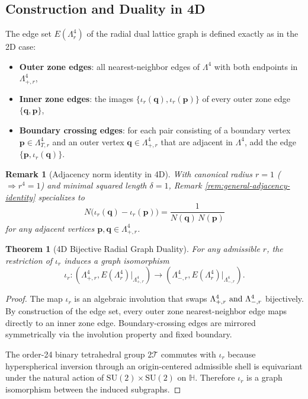 \documentclass{article}
\newtheorem{theorem}{Theorem}
\newtheorem{remark}{Remark}
\begin{document}
\subsection{Construction and Duality in 4D}
\label{subsec:4d-graph-construction-duality}
The edge set \(E(\Lambda_r^4)\) of the radial dual lattice graph is defined exactly as in the 2D case:
\begin{itemize}
  \item \textbf{Outer zone edges}: all nearest-neighbor edges of \(\Lambda^4\) with both endpoints in \(\Lambda_{+,r}^4\),
  \item \textbf{Inner zone edges}: the images \(\{\iota_r(\mathbf{q}),\iota_r(\mathbf{p})\}\) of every outer zone edge \(\{\mathbf{q},\mathbf{p}\}\),
  \item \textbf{Boundary crossing edges}: for each pair consisting of a boundary vertex \(\mathbf{p} \in \Lambda_{T,r}^4\) and an outer vertex \(\mathbf{q}\in\Lambda_{+,r}^4\) that are adjacent in \(\Lambda^4\), add the edge \(\{\mathbf{p},\iota_r(\mathbf{q})\}\).
\end{itemize}

\begin{remark}[Adjacency norm identity in 4D]
\label{rem:adj-norm-identity-4d}
With canonical radius $r=1$ ($\Rightarrow r^4=1$) and minimal squared length $\delta=1$, Remark \ref{rem:general-adjacency-identity} specializes to
\[
N\bigl(\iota_r(\mathbf{q}) - \iota_r(\mathbf{p})\bigr) = \frac{1}{N(\mathbf{q})\,N(\mathbf{p})}
\]
for any adjacent vertices $\mathbf{p},\mathbf{q} \in \Lambda_{+,r}^4$.
\end{remark}

\begin{theorem}[4D Bijective Radial Graph Duality]
\label{thm:4d-duality}
For any admissible \(r\), the restriction of \(\iota_r\) induces a graph isomorphism
\[
\iota_r\colon(\Lambda_{+,r}^4,E(\Lambda_r^4)|_{\Lambda_{+,r}^4})\to(\Lambda_{-,r}^4,E(\Lambda_r^4)|_{\Lambda_{-,r}^4}).
\]
\end{theorem}
\begin{proof}
The map \(\iota_r\) is an algebraic involution that swaps \(\Lambda_{+,r}^4$ and \(\Lambda_{-,r}^4\) bijectively. By construction of the edge set, every outer zone nearest-neighbor edge maps directly to an inner zone edge. Boundary-crossing edges are mirrored symmetrically via the involution property and fixed boundary.

The order-24 binary tetrahedral group \(2\mathcal{T}\) commutes with \(\iota_r\) because hyperspherical inversion through an origin-centered admissible shell is equivariant under the natural action of \(\mathrm{SU}(2)\times\mathrm{SU}(2)\) on \(\mathbb{H}\). Therefore \(\iota_r\) is a graph isomorphism between the induced subgraphs.
\end{proof}
\end{document}
